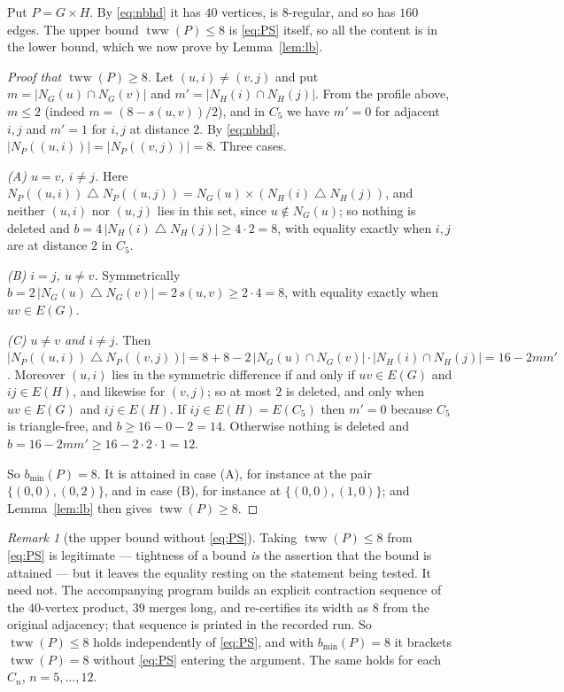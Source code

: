 \documentclass[11pt]{amsart}
\theoremstyle{remark}
\newtheorem{remark}[theorem]{Remark}
\DeclareMathOperator{\tww}{tww}
\newcommand{\sd}{\mathbin{\triangle}}
\begin{document}
Put $P=G\times H$. By \eqref{eq:nbhd} it has $40$ vertices, is $8$-regular, and
so has $160$ edges. The upper bound $\tww(P)\le8$ is \eqref{eq:PS} itself, so
all the content is in the lower bound, which we now prove by
Lemma~\ref{lem:lb}.

\begin{proof}[Proof that $\tww(P)\ge8$]
Let $(u,i)\ne(v,j)$ and put $m=|N_G(u)\cap N_G(v)|$ and
$m'=|N_H(i)\cap N_H(j)|$. From the profile above, $m\le2$ (indeed
$m=(8-s(u,v))/2$), and in $C_5$ we have $m'=0$ for adjacent $i,j$ and $m'=1$
for $i,j$ at distance $2$. By \eqref{eq:nbhd},
$|N_P((u,i))|=|N_P((v,j))|=8$. Three cases.

\emph{(A) $u=v$, $i\ne j$.} Here
$N_P((u,i))\sd N_P((u,j))=N_G(u)\times(N_H(i)\sd N_H(j))$, and neither $(u,i)$
nor $(u,j)$ lies in this set, since $u\notin N_G(u)$; so nothing is deleted and
$b=4\,|N_H(i)\sd N_H(j)|\ge4\cdot2=8$, with equality exactly when $i,j$ are at
distance $2$ in $C_5$.

\emph{(B) $i=j$, $u\ne v$.} Symmetrically
$b=2\,|N_G(u)\sd N_G(v)|=2\,s(u,v)\ge2\cdot4=8$, with equality exactly when
$uv\in E(G)$.

\emph{(C) $u\ne v$ and $i\ne j$.} Then
$|N_P((u,i))\sd N_P((v,j))|=8+8-2\,|N_G(u)\cap N_G(v)|\cdot|N_H(i)\cap N_H(j)|
=16-2mm'$. Moreover $(u,i)$ lies in the symmetric difference if and only if
$uv\in E(G)$ and $ij\in E(H)$, and likewise for $(v,j)$; so at most $2$ is
deleted, and only when $uv\in E(G)$ and $ij\in E(H)$. If $ij\in E(H)=E(C_5)$
then $m'=0$ because $C_5$ is triangle-free, and $b\ge16-0-2=14$. Otherwise
nothing is deleted and $b=16-2mm'\ge16-2\cdot2\cdot1=12$.

So $b_{\min}(P)=8$. It is attained in case (A), for instance at the pair
$\{(0,0),(0,2)\}$, and in case (B), for instance at $\{(0,0),(1,0)\}$; and
Lemma~\ref{lem:lb} then gives $\tww(P)\ge8$.
\end{proof}

\begin{remark}[the upper bound without \eqref{eq:PS}]\label{rem:noncirc}
Taking $\tww(P)\le8$ from \eqref{eq:PS} is legitimate --- tightness of a bound
\emph{is} the assertion that the bound is attained --- but it leaves the
equality resting on the statement being tested. It need not. The accompanying
program builds an explicit contraction sequence of the $40$-vertex product,
$39$ merges long, and re-certifies its width as $8$ from the original
adjacency; that sequence is printed in the recorded run. So $\tww(P)\le8$ holds
independently of \eqref{eq:PS}, and with $b_{\min}(P)=8$ it brackets
$\tww(P)=8$ without \eqref{eq:PS} entering the argument. The same holds for
each $C_n$, $n=5,\dots,12$.
\end{remark}
\end{document}
